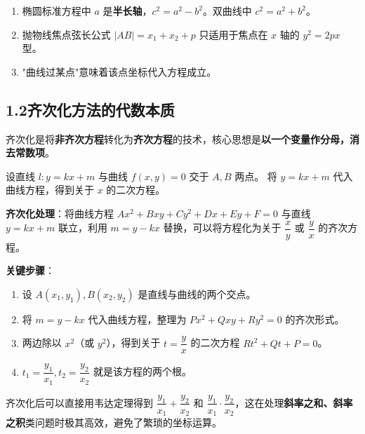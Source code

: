 \documentclass[12pt, a4paper]{ctexart}
\begin{document}
\begin{warnbox}[易错提醒]
\begin{enumerate}[leftmargin=1.5em]
  \item 椭圆标准方程中 $a$ 是\textbf{半长轴}，$c^2=a^2-b^2$。双曲线中 $c^2=a^2+b^2$。
  \item 抛物线焦点弦长公式 $|AB|=x_1+x_2+p$ 只适用于焦点在 $x$ 轴的 $y^2=2px$ 型。
  \item "曲线过某点"意味着该点坐标代入方程成立。
\end{enumerate}
\end{warnbox}

\subsection*{1.2\quad 齐次化方法的代数本质}

\begin{knowledgebox}[什么是齐次化]
齐次化是将\textbf{非齐次方程}转化为\textbf{齐次方程}的技术，核心思想是\textbf{以一个变量作分母，消去常数项}。

设直线 $l:y=kx+m$ 与曲线 $f(x,y)=0$ 交于 $A,B$ 两点。
将 $y=kx+m$ 代入曲线方程，得到关于 $x$ 的二次方程。
\end{knowledgebox}

\begin{knowledgebox}[齐次化的标准操作]
\textbf{齐次化处理}：将曲线方程 $Ax^2+Bxy+Cy^2+Dx+Ey+F=0$ 与直线 $y=kx+m$ 联立，利用 $m=y-kx$ 替换，可以将方程化为关于 $\dfrac{x}{y}$ 或 $\dfrac{y}{x}$ 的齐次方程。

\medskip
\noindent\textbf{关键步骤}：
\begin{enumerate}[leftmargin=1.5em]
  \item 设 $A(x_1,y_1),B(x_2,y_2)$ 是直线与曲线的两个交点。
  \item 将 $m=y-kx$ 代入曲线方程，整理为 $Px^2+Qxy+Ry^2=0$ 的齐次形式。
  \item 两边除以 $x^2$（或 $y^2$），得到关于 $t=\dfrac{y}{x}$ 的二次方程 $Rt^2+Qt+P=0$。
  \item $t_1=\dfrac{y_1}{x_1},t_2=\dfrac{y_2}{x_2}$ 就是该方程的两个根。
\end{enumerate}
\end{knowledgebox}

\begin{tipbox}[齐次化的优势]
齐次化后可以直接用韦达定理得到 $\dfrac{y_1}{x_1}+\dfrac{y_2}{x_2}$ 和 $\dfrac{y_1}{x_1}\cdot\dfrac{y_2}{x_2}$，这在处理\textbf{斜率之和、斜率之积}类问题时极其高效，避免了繁琐的坐标运算。
\end{tipbox}
\end{document}
